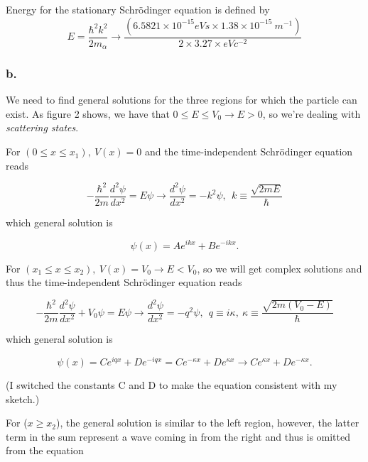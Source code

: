 \documentclass{article}
\begin{document}
Energy for the stationary Schrödinger equation is defined by
\begin{equation}
E = \frac{\hbar^2k^2}{2m_{\alpha}} \rightarrow \frac{(6.5821\times 10^{-15}eVs\times 1.38\times 10^{-15} \ m^{-1})}{2\times 3.27\times eVc^{-2}}
\end{equation}

\subsubsection*{b.}

We need to find general solutions for the three regions for which the particle can exist. As figure 2 shows, we have that $0 \leq E \leq V_0 \rightarrow E > 0$, so we're dealing with \textit{scattering states}.

\bigskip

For $(0 \leq x \leq x_1), \ V(x) = 0$ and the time-independent Schrödinger equation reads

\begin{equation}
-\frac{\hbar^2}{2m}\frac{d^2\psi}{dx^2} = E\psi \rightarrow \frac{d^2\psi}{dx^2} = -k^2\psi, \ \ k \equiv \frac{\sqrt{2mE}}{\hbar}
\end{equation}

which general solution is

\begin{equation}
\psi(x) = Ae^{ikx} + Be^{-ikx}.
\end{equation}

For $(x_1 \leq x \leq x_2), \ V(x) = V_0 \rightarrow E < V_0$, so we will get complex solutions and thus the time-independent Schrödinger equation reads

\begin{equation}
-\frac{\hbar^2}{2m}\frac{d^2\psi}{dx^2} + V_0\psi = E\psi \rightarrow \frac{d^2\psi}{dx^2} = -q^2\psi, \ \ q \equiv i\kappa, \ \kappa \equiv \frac{\sqrt{2m(V_0 - E)}}{\hbar}
\end{equation}

which general solution is

\begin{equation}
\psi(x) = Ce^{iqx} + De^{-iqx} = Ce^{-\kappa x} + De^{\kappa x} \rightarrow Ce^{\kappa x} + De^{-\kappa x}.
\end{equation}

(I switched the constants C and D to make the equation consistent with my sketch.)

For ($x \geq x_2$), the general solution is similar to the left region, however, the latter term in the sum represent a wave coming in from the right and thus is omitted from the equation
\end{document}
